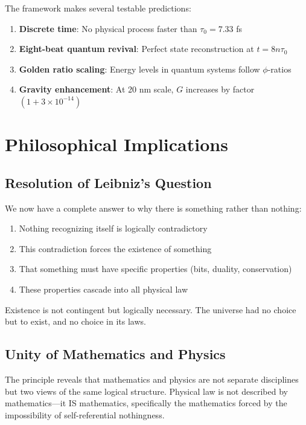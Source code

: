 \documentclass[12pt,a4paper]{article}
\begin{document}
The framework makes several testable predictions:

\begin{enumerate}
\item \textbf{Discrete time}: No physical process faster than $\tau_0 = 7.33$ fs
\item \textbf{Eight-beat quantum revival}: Perfect state reconstruction at $t = 8n\tau_0$
\item \textbf{Golden ratio scaling}: Energy levels in quantum systems follow $\phi$-ratios
\item \textbf{Gravity enhancement}: At 20 nm scale, $G$ increases by factor $(1 + 3\times10^{-14})$
\end{enumerate}

\section{Philosophical Implications}

\subsection{Resolution of Leibniz's Question}

We now have a complete answer to why there is something rather than nothing:

\begin{enumerate}
\item Nothing recognizing itself is logically contradictory
\item This contradiction forces the existence of something
\item That something must have specific properties (bits, duality, conservation)
\item These properties cascade into all physical law
\end{enumerate}

Existence is not contingent but logically necessary. The universe had no choice but to exist, and no choice in its laws.

\subsection{Unity of Mathematics and Physics}

The principle reveals that mathematics and physics are not separate disciplines but two views of the same logical structure. Physical law is not described by mathematics---it IS mathematics, specifically the mathematics forced by the impossibility of self-referential nothingness.
\end{document}
